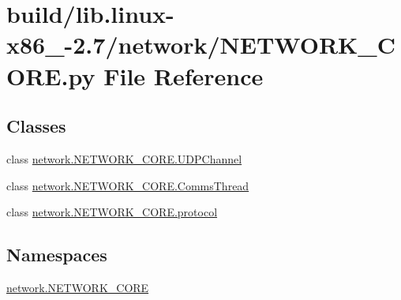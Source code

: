 \hypertarget{build_2lib_8linux-x86__64-2_87_2network_2NETWORK__CORE_8py}{}\section{build/lib.linux-\/x86\+\_-\/2.7/network/\+N\+E\+T\+W\+O\+R\+K\+\_\+\+C\+O\+R\+E.py File Reference}
\label{build_2lib_8linux-x86__64-2_87_2network_2NETWORK__CORE_8py}
\subsection*{Classes}
\begin{DoxyCompactItemize}
\item 
class \hyperlink{classnetwork_1_1NETWORK__CORE_1_1UDPChannel}{network.\+N\+E\+T\+W\+O\+R\+K\+\_\+\+C\+O\+R\+E.\+U\+D\+P\+Channel}
\item 
class \hyperlink{classnetwork_1_1NETWORK__CORE_1_1CommsThread}{network.\+N\+E\+T\+W\+O\+R\+K\+\_\+\+C\+O\+R\+E.\+Comms\+Thread}
\item 
class \hyperlink{classnetwork_1_1NETWORK__CORE_1_1protocol}{network.\+N\+E\+T\+W\+O\+R\+K\+\_\+\+C\+O\+R\+E.\+protocol}
\end{DoxyCompactItemize}
\subsection*{Namespaces}
\begin{DoxyCompactItemize}
\item 
 \hyperlink{namespacenetwork_1_1NETWORK__CORE}{network.\+N\+E\+T\+W\+O\+R\+K\+\_\+\+C\+O\+R\+E}
\end{DoxyCompactItemize}
